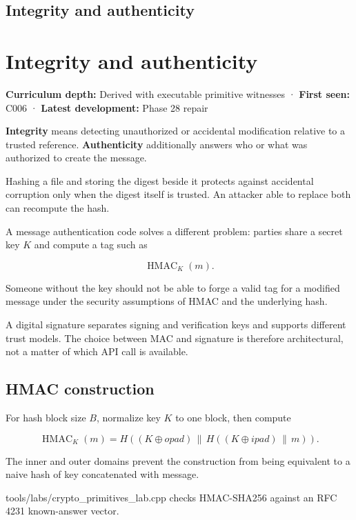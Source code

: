 \hypertarget{appendix-cbe594d1ab0a}{}
\section*{Integrity and authenticity}
\chapter{Integrity and authenticity}\label{appendix-cbe594d1ab0a-integrity-and-authenticity}

\textbf{Curriculum depth:} Derived with executable primitive witnesses · \textbf{First seen:} C006 · \textbf{Latest development:} Phase 28 repair

\textbf{Integrity} means detecting unauthorized or accidental modification relative to a trusted reference. \textbf{Authenticity} additionally answers who or what was authorized to create the message.

Hashing a file and storing the digest beside it protects against accidental corruption only when the digest itself is trusted. An attacker able to replace both can recompute the hash.

A message authentication code solves a different problem: parties share a secret key \(K\) and compute a tag such as

\[
\operatorname{HMAC}_K(m).
\]

Someone without the key should not be able to forge a valid tag for a modified message under the security assumptions of HMAC and the underlying hash.

A digital signature separates signing and verification keys and supports different trust models. The choice between MAC and signature is therefore architectural, not a matter of which API call is available.

\section{HMAC construction}\label{appendix-cbe594d1ab0a-hmac-construction}

For hash block size \(B\), normalize key \(K\) to one block, then compute

\[
\operatorname{HMAC}_K(m)
=
H((K\oplus opad)\,\|\,
  H((K\oplus ipad)\,\|\,m)).
\]

The inner and outer domains prevent the construction from being equivalent to a naive hash of key concatenated with message.

tools/labs/crypto\_primitives\_lab.cpp checks HMAC-SHA256 against an RFC 4231 known-answer vector.


